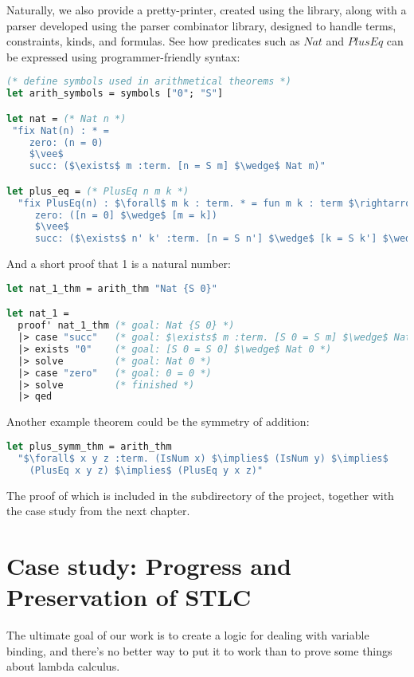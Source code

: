 \documentclass[english, mgr]{iithesis}
\newcommand{\lstt}[1]{{\text{\lstinline[columns=fixed,mathescape]{#1}}}}
\begin{document}
Naturally, we also provide a pretty-printer, created using the \lstt{EasyFormat} library,
along with a parser developed using the \lstt{Angstrom} parser combinator library,
designed to handle terms, constraints, kinds, and formulas.
See how predicates such as ${Nat}$ and ${PlusEq}$ can be expressed using
programmer-friendly syntax:
\begin{lstlisting}[mathescape, language=OCaml, escapebegin=\color{codepurple}]
(* define symbols used in arithmetical theorems *)
let arith_symbols = symbols ["0"; "S"]

let nat = (* Nat n *)
 "fix Nat(n) : * =
    zero: (n = 0)
    $\vee$
    succ: ($\exists$ m :term. [n = S m] $\wedge$ Nat m)"

let plus_eq = (* PlusEq n m k *)
  "fix PlusEq(n) : $\forall$ m k : term. * = fun m k : term $\rightarrow$
     zero: ([n = 0] $\wedge$ [m = k])
     $\vee$
     succ: ($\exists$ n' k' :term. [n = S n'] $\wedge$ [k = S k'] $\wedge$ PlusEq n' m k')"
\end{lstlisting}
And a short proof that 1 is a natural number:
\begin{lstlisting}[mathescape, language=OCaml, escapebegin=\color{codegreen}]
let nat_1_thm = arith_thm "Nat {S 0}"

let nat_1 =
  proof' nat_1_thm (* goal: Nat {S 0} *)
  |> case "succ"   (* goal: $\exists$ m :term. [S 0 = S m] $\wedge$ Nat m *)
  |> exists "0"    (* goal: [S 0 = S 0] $\wedge$ Nat 0 *)
  |> solve         (* goal: Nat 0 *)
  |> case "zero"   (* goal: 0 = 0 *)
  |> solve         (* finished *)
  |> qed
\end{lstlisting}
Another example theorem could be the symmetry of addition:
\begin{lstlisting}[mathescape, language=OCaml, escapebegin=\color{codepurple}]
let plus_symm_thm = arith_thm
  "$\forall$ x y z :term. (IsNum x) $\implies$ (IsNum y) $\implies$
    (PlusEq x y z) $\implies$ (PlusEq y x z)"
\end{lstlisting}
The proof of which is included in the \lstt{examples} subdirectory of the project,
together with the case study from the next chapter.
\chapter{Case study: Progress and Preservation of STLC}

The ultimate goal of our work is to create a logic for dealing with variable binding,
and there's no better way to put it to work than to prove some things about lambda calculus.
\end{document}
